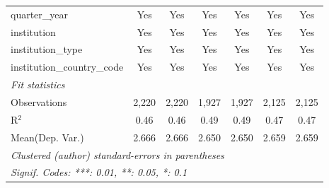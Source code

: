 \begin{tabular}{lcccccc}
   quarter\_year                      & Yes     & Yes      & Yes     & Yes      & Yes     & Yes\\  
   institution                        & Yes     & Yes      & Yes     & Yes      & Yes     & Yes\\  
   institution\_type                  & Yes     & Yes      & Yes     & Yes      & Yes     & Yes\\  
   institution\_country\_code         & Yes     & Yes      & Yes     & Yes      & Yes     & Yes\\  
   \midrule
   \emph{Fit statistics}\\
   Observations                       & 2,220   & 2,220    & 1,927   & 1,927    & 2,125   & 2,125\\  
   R$^2$                              & 0.46    & 0.46     & 0.49    & 0.49     & 0.47    & 0.47\\  
Mean(Dep. Var.) & 2.666 & 2.666 & 2.650 & 2.650 & 2.659 & 2.659 \\
   \midrule \midrule
   \multicolumn{7}{l}{\emph{Clustered (author) standard-errors in parentheses}}\\
   \multicolumn{7}{l}{\emph{Signif. Codes: ***: 0.01, **: 0.05, *: 0.1}}\\
\end{tabular}
\par\endgroup
